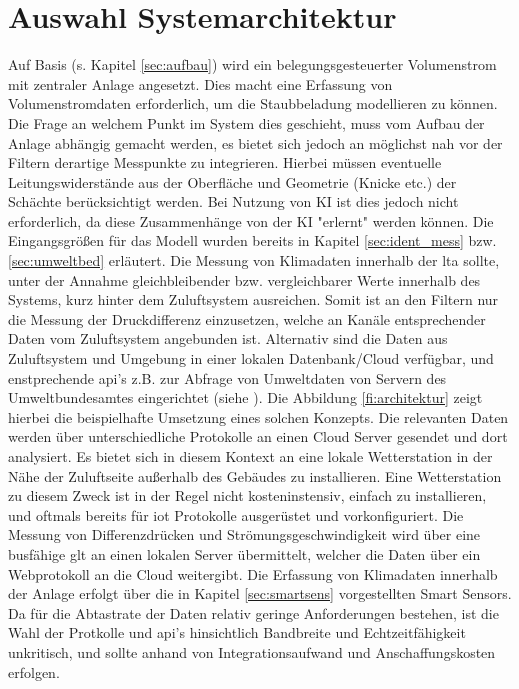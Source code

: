     \section{Auswahl Systemarchitektur}
    Auf Basis (s. Kapitel \ref{sec:aufbau}) wird ein belegungsgesteuerter Volumenstrom mit zentraler Anlage angesetzt. Dies macht eine Erfassung von Volumenstromdaten erforderlich, um die Staubbeladung modellieren zu können. Die Frage an welchem Punkt im System dies geschieht, muss vom Aufbau der Anlage abhängig gemacht werden, es bietet sich jedoch an möglichst nah vor der Filtern derartige Messpunkte zu integrieren. Hierbei müssen eventuelle Leitungswiderstände aus der Oberfläche und Geometrie (Knicke etc.) der Schächte berücksichtigt werden. Bei Nutzung von KI ist dies jedoch nicht erforderlich, da diese Zusammenhänge von der KI "erlernt" werden können. Die Eingangsgrößen für das Modell wurden bereits in Kapitel \ref{sec:ident_mess} bzw. \ref{sec:umweltbed} erläutert. Die Messung von Klimadaten innerhalb der \ac{lta} sollte, unter der Annahme gleichbleibender bzw. vergleichbarer Werte innerhalb des Systems, kurz hinter dem Zuluftsystem ausreichen. Somit ist an den Filtern nur die Messung der Druckdifferenz einzusetzen, welche an Kanäle entsprechender Daten vom Zuluftsystem angebunden ist. Alternativ sind die Daten aus Zuluftsystem und Umgebung in einer lokalen Datenbank/Cloud verfügbar, und enstprechende \ac{api}'s z.B. zur Abfrage von Umweltdaten von Servern des Umweltbundesamtes eingerichtet (siehe \cite{webhookUBA}). Die Abbildung \ref{fi:architektur} zeigt hierbei die beispielhafte Umsetzung eines solchen Konzepts. Die relevanten Daten werden über unterschiedliche Protokolle an einen Cloud Server gesendet und dort analysiert. Es bietet sich in diesem Kontext an eine lokale Wetterstation in der Nähe der Zuluftseite außerhalb des Gebäudes zu installieren. Eine Wetterstation zu diesem Zweck ist in der Regel nicht kosteninstensiv, einfach zu installieren, und oftmals bereits für \ac{iot} Protokolle ausgerüstet und vorkonfiguriert. Die Messung von Differenzdrücken und Strömungsgeschwindigkeit wird über eine busfähige \ac{glt} an einen lokalen Server übermittelt, welcher die Daten über ein Webprotokoll an die Cloud weitergibt. Die Erfassung von Klimadaten innerhalb der Anlage erfolgt über die in Kapitel \ref{sec:smartsens} vorgestellten Smart Sensors. Da für die Abtastrate der Daten relativ geringe Anforderungen bestehen, ist die Wahl der Protkolle und \ac{api}'s hinsichtlich Bandbreite und Echtzeitfähigkeit unkritisch, und sollte anhand von Integrationsaufwand und Anschaffungskosten erfolgen.
